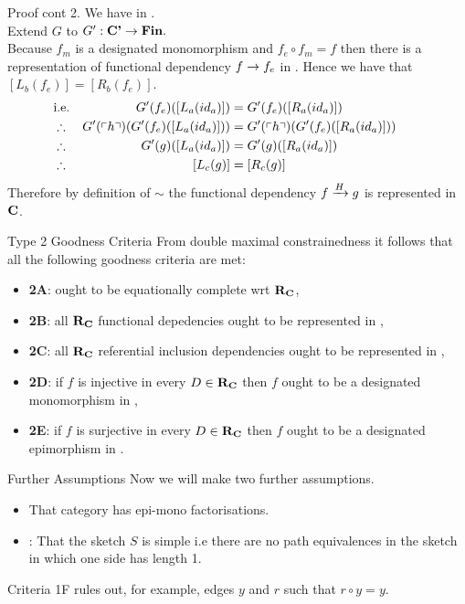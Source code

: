 \begin{frame}{Proof cont 2.}
We have   in \catcp.\\
\medskip
Extend $G$ to $G':\catcp \morph \Fin.$ \\
Because $f_m$ is a designated monomorphism and $f_e \circ f_m = f$ then
there is a representation of functional dependency $f \morph f_e$ in \catc.
Hence  we have that $[L_b(f_e)]= [R_b(f_e)]$.
\medskip
\begin{align*}
&\mbox{i.e.}& G'(f_e)([L_a(id_a)])              &= G'(f_e)([R_a(id_a)])       \\
&\therefore & G'(\qq{h}) (G'(f_e)([L_a(id_a)])) &= G'(\qq{h}) (G'(f_e)([R_a(id_a)])) \\
&\therefore & G'(g)([L_a(id_a)])              &= G'(g)([R_a(id_a)]) & &    \\
&\therefore & [L_c(g)] &= [R_c(g)] 
\end{align*}
Therefore by definition of $\sim$ the functional dependency
$\fundep{H}{f}{g}$ is represented in $\catc$.
\end{frame}
\fi

\begin{frame}{Type 2 Goodness Criteria}{\slidecontext}
From double maximal constrainedness it follows that all the following goodness criteria are met: 
\begin{itemize}
\item \textbf{2A}:  \catcw ought to be equationally complete wrt $\reqtc$,         
\item \textbf{2B}:  all $\reqtc$ functional depedencies ought to be represented in \catc,
\item \textbf{2C}:  all $\reqtc$ referential inclusion dependencies ought to be represented in \catc, 
\pause \item \textbf{2D}:  if $f$ is injective in every $D \in \reqtc$ then $f$ ought to be a designated monomorphism in \catc,
\pause \item \textbf{2E}:  if $f$ is surjective in every $D \in \reqtc$ then $f$ ought to be a designated epimorphism in \catc.
\end{itemize}
\iffalse
We can also show that \textbf{2B} can be weakened. If all functional dependencies \textbf{upon edges} from sketch $S$ are represented then all functional dependencies are represented. \highlight{Too much information}
\fi
\end{frame}

\begin{frame}{Further Assumptions}
Now we will make two further assumptions.
\begin{itemize}
\item That category \catcw has epi-mono factorisations.
\item {}: That the sketch $S$ is simple i.e there are no path equivalences 
in the sketch in which one side has length 1. 
\end{itemize}
Criteria 1F rules out, for example, edges $y$ and $r$ such that $r \circ y = y$.
\end{frame}

